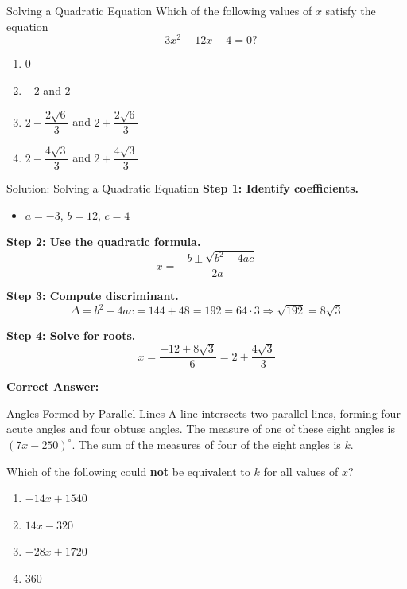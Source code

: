 \documentclass{beamer}
\begin{document}
\begin{frame}{Solving a Quadratic Equation}
\small
Which of the following values of $x$ satisfy the equation
\[
-3x^2 + 12x + 4 = 0 ?
\]

\begin{enumerate}
    \item[A.] $0$
    \item[B.] $-2$ and $2$
    \item[C.] $2 - \dfrac{2\sqrt{6}}{3}$ and $2 + \dfrac{2\sqrt{6}}{3}$
    \item[D.] $2 - \dfrac{4\sqrt{3}}{3}$ and $2 + \dfrac{4\sqrt{3}}{3}$
\end{enumerate}
\end{frame}

\begin{frame}{Solution: Solving a Quadratic Equation}
\small
\textbf{Step 1: Identify coefficients.}
\begin{itemize}
    \item $a = -3$, $b = 12$, $c = 4$
\end{itemize}

\textbf{Step 2: Use the quadratic formula.}
\[
x = \frac{-b \pm \sqrt{b^2 - 4ac}}{2a}
\]

\textbf{Step 3: Compute discriminant.}
\[
\Delta = b^2 - 4ac = 144 + 48 = 192 = 64 \cdot 3
\Rightarrow \sqrt{192} = 8\sqrt{3}
\]

\textbf{Step 4: Solve for roots.}
\[
x = \frac{-12 \pm 8\sqrt{3}}{-6}
= 2 \pm \frac{4\sqrt{3}}{3}
\]

\textbf{Correct Answer:} 
\end{frame}



\begin{frame}{Angles Formed by Parallel Lines}
\small
A line intersects two parallel lines, forming four acute angles and four obtuse angles. The measure of one of these eight angles is $(7x - 250)^\circ$. The sum of the measures of four of the eight angles is $k$.

Which of the following could \textbf{not} be equivalent to $k$ for all values of $x$?

\begin{enumerate}
    \item[A.] $-14x + 1540$
    \item[B.] $14x - 320$
    \item[C.] $-28x + 1720$
    \item[D.] $360$
\end{enumerate}
\end{frame}
\end{document}
